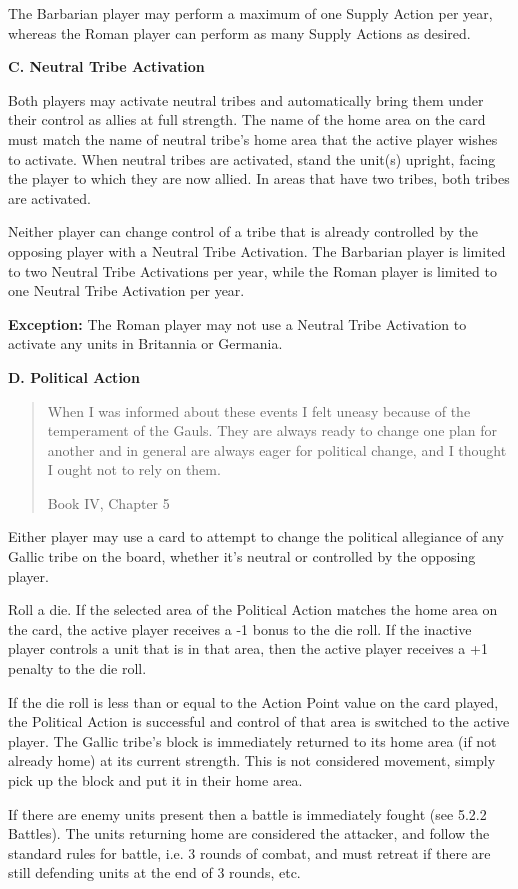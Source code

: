 The Barbarian player may perform a maximum of one Supply Action per year, whereas the Roman player can perform as many Supply Actions as desired.

\textbf{C. Neutral Tribe Activation}
\par
Both players may activate neutral tribes and automatically bring them under their control as allies at full strength. The name of the home area on the card must match the name of neutral tribe's home area that the active player wishes to activate. When neutral tribes are activated, stand the unit(s) upright, facing the player to which they are now allied. In areas that have two tribes, both tribes are activated.

Neither player can change control of a tribe that is already controlled by the opposing player with a Neutral Tribe Activation. The Barbarian player is limited to two Neutral Tribe Activations per year, while the Roman player is limited to one Neutral Tribe Activation per year.

\textbf{Exception:} The Roman player may not use a Neutral Tribe Activation to activate any units in Britannia or Germania.

\textbf{D. Political Action}
\blockquote[Book IV, Chapter 5]{When I was informed about these events I felt uneasy because of the temperament of the Gauls. They are always ready to change one plan for another and in general are always eager for political change, and I thought I ought not to rely on them.}
\par
Either player may use a card to attempt to change the political allegiance of any Gallic tribe on the board, whether it's neutral or controlled by the opposing player.

Roll a die. If the selected area of the Political Action matches the home area on the card, the active player receives a -1 bonus to the die roll. If the inactive player controls a unit that is in that area, then the active player receives a +1 penalty to the die roll.

If the die roll is less than or equal to the Action Point value on the card played, the Political Action is successful and control of that area is switched to the active player. The Gallic tribe's block is immediately returned to its home area (if not already home) at its current strength. This is not considered movement, simply pick up the block and put it in their home area.

If there are enemy units present then a battle is immediately fought (see 5.2.2 Battles). The units returning home are considered the attacker, and follow the standard rules for battle, i.e. 3 rounds of combat, and must retreat if there are still defending units at the end of 3 rounds, etc.

